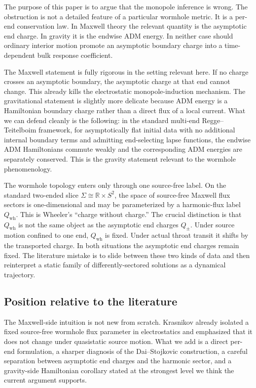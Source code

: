 \documentclass[aps,prd,onecolumn,nofootinbib,superscriptaddress]{revtex4-2}
\begin{document}
The purpose of this paper is to argue that the monopole inference is wrong. The obstruction is not a detailed feature of a particular wormhole metric. It is a per-end conservation law. In Maxwell theory the relevant quantity is the asymptotic end charge. In gravity it is the endwise ADM energy. In neither case should ordinary interior motion promote an asymptotic boundary charge into a time-dependent bulk response coefficient.

The Maxwell statement is fully rigorous in the setting relevant here. If no charge crosses an asymptotic boundary, the asymptotic charge at that end cannot change. This already kills the electrostatic monopole-induction mechanism. The gravitational statement is slightly more delicate because ADM energy is a Hamiltonian boundary charge rather than a direct flux of a local current. What we can defend cleanly is the following: in the standard multi-end Regge--Teitelboim framework, for asymptotically flat initial data with no additional internal boundary terms and admitting end-selecting lapse functions, the endwise ADM Hamiltonians commute weakly and the corresponding ADM energies are separately conserved. This is the gravity statement relevant to the wormhole phenomenology.

The wormhole topology enters only through one source-free label. On the standard two-ended slice $\Sigma \cong \mathbb{R}\times S^2$, the space of source-free Maxwell flux sectors is one-dimensional and may be parameterized by a harmonic-flux label $Q_{\mathrm{wh}}$. This is Wheeler's ``charge without charge.'' The crucial distinction is that $Q_{\mathrm{wh}}$ is not the same object as the asymptotic end charges $Q_\pm$. Under source motion confined to one end, $Q_{\mathrm{wh}}$ is fixed. Under actual throat transit it shifts by the transported charge. In both situations the asymptotic end charges remain fixed. The literature mistake is to slide between these two kinds of data and then reinterpret a static family of differently-sectored solutions as a dynamical trajectory.

\subsection*{Position relative to the literature}

The Maxwell-side intuition is not new from scratch. Krasnikov already isolated a fixed source-free wormhole flux parameter in electrostatics and emphasized that it does not change under quasistatic source motion.\cite{Krasnikov2008ElectrostaticInteraction,Krasnikov2020CommentObserving} What we add is a direct per-end formulation, a sharper diagnosis of the Dai--Stojkovic construction, a careful separation between asymptotic end charges and the harmonic sector, and a gravity-side Hamiltonian corollary stated at the strongest level we think the current argument supports.
\end{document}
